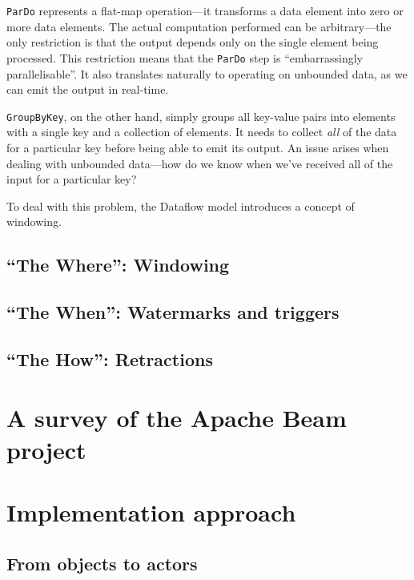 
\verb|ParDo| represents a flat-map operation---it transforms a data element into zero or more data elements.
The actual computation performed can be arbitrary---the only restriction is that the output depends only on the single element being processed.
This restriction means that the \verb|ParDo| step is ``embarrassingly parallelisable''.
It also translates naturally to operating on unbounded data, as we can emit the output in real-time.

\verb|GroupByKey|, on the other hand, simply groups all key-value pairs into elements with a single key and a collection of elements.
It needs to collect \emph{all} of the data for a particular key before being able to emit its output.
An issue arises when dealing with unbounded data---how do we know when we've received all of the input for a particular key?

To deal with this problem, the Dataflow model introduces a concept of windowing.

\subsection{``The Where'': Windowing}

\subsection{``The When'': Watermarks and triggers}

\subsection{``The How'': Retractions}

\section{A survey of the Apache Beam project}\label{sec:prep:beam}

\section{Implementation approach}\label{sec:prep:implementation}

\subsection{From objects to actors}

